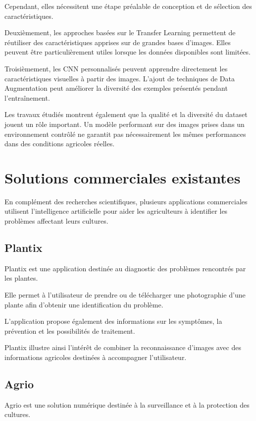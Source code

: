 \documentclass[12pt,a4paper,oneside]{report}
\begin{document}
Cependant, elles nécessitent une étape préalable de
conception et de sélection des caractéristiques.

Deuxièmement, les approches basées sur le Transfer Learning
permettent de réutiliser des caractéristiques apprises
sur de grandes bases d'images. Elles peuvent être
particulièrement utiles lorsque les données disponibles
sont limitées.

Troisièmement, les CNN personnalisés peuvent apprendre
directement les caractéristiques visuelles à partir
des images. L'ajout de techniques de Data Augmentation
peut améliorer la diversité des exemples présentés
pendant l'entraînement.

Les travaux étudiés montrent également que la qualité
et la diversité du dataset jouent un rôle important.
Un modèle performant sur des images prises dans un
environnement contrôlé ne garantit pas nécessairement
les mêmes performances dans des conditions agricoles réelles.

\section{Solutions commerciales existantes}

En complément des recherches scientifiques, plusieurs
applications commerciales utilisent l'intelligence
artificielle pour aider les agriculteurs à identifier
les problèmes affectant leurs cultures.

\subsection{Plantix}

Plantix est une application destinée au diagnostic
des problèmes rencontrés par les plantes.

Elle permet à l'utilisateur de prendre ou de télécharger
une photographie d'une plante afin d'obtenir une
identification du problème.

L'application propose également des informations sur
les symptômes, la prévention et les possibilités
de traitement.

Plantix illustre ainsi l'intérêt de combiner la
reconnaissance d'images avec des informations agricoles
destinées à accompagner l'utilisateur.

\subsection{Agrio}

Agrio est une solution numérique destinée à la surveillance
et à la protection des cultures.
\end{document}

